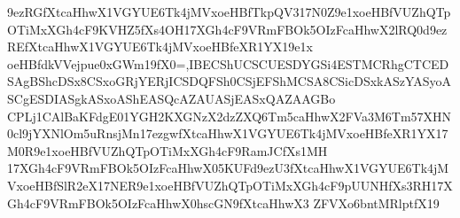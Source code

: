\documentclass[multi=frame]{standalone}
\begin{document}
\begin{world}
        9ezRGfXtcaHhwX1VGYUE6Tk4jMVxoeHBfTkpQV317N0Z9e1xoeHBfVUZhQTpOTiMxXGh4cF9KVHZ5fXs4OH17XGh4cF9VRmFBOk5OIzFcaHhwX2lRQ0d9ezREfXtcaHhwX1VGYUE6Tk4jMVxoeHBfeXR1YX19e1x
        oeHBfdkVVejpue0xGWm19fX0=,IBECShUCSCUESDYGSi4ESTMCRhgCTCEDSAgBShcDSx8CSxoGRjYERjICSDQFSh0CSjEFShMCSA8CSicDSxkASzYASyoASCgESDIASgkASxoAShEASQcAZAUASjEASxQAZAAGBo
        CPLj1CAlBaKFdgE01YGH2KXGNzX2dzZXQ6Tm5caHhwX2FVa3M6Tm57XHN0cl9jYXNlOm5uRnsjMn17ezgwfXtcaHhwX1VGYUE6Tk4jMVxoeHBfeXR1YX17M0R9e1xoeHBfVUZhQTpOTiMxXGh4cF9RamJCfXs1MH
        17XGh4cF9VRmFBOk5OIzFcaHhwX05KUFd9ezU3fXtcaHhwX1VGYUE6Tk4jMVxoeHBfSlR2eX17NER9e1xoeHBfVUZhQTpOTiMxXGh4cF9pUUNHfXs3RH17XGh4cF9VRmFBOk5OIzFcaHhwX0hscGN9fXtcaHhwX3
        ZFVXo6bntMRlptfX19
    \end{world}
\end{document}
